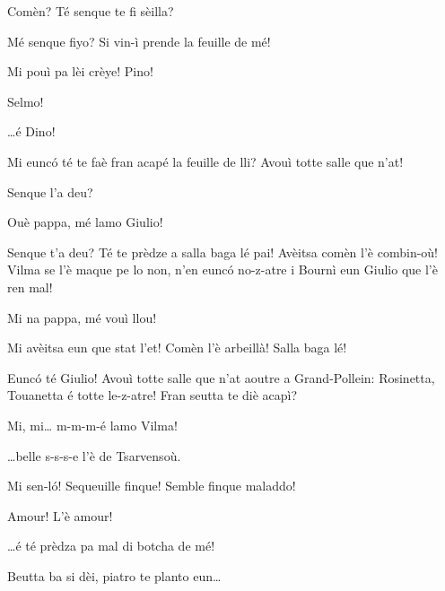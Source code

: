 \begin{drama}
\Selmospeaks Comèn? Té senque te fi sèilla?

\Pinospeaks{} Mé senque fiyo? Si vin-ì prende la feuille de mé!

\Selmospeaks{} Mi pouì pa lèi crèye! Pino!

\Pinospeaks Selmo!

\Dinospeaks \ldots é Dino!

\Selmospeaks{} Mi eunc\'o té te faè fran acapé la feuille de lli? Avouì totte salle que n'at!

\Pinospeaks{} Senque l'a deu?

\Vilmaspeaks Ouè pappa, mé lamo Giulio!

\Pinospeaks{} Senque t'a deu? Té te prèdze a salla baga  lé pai! Avèitsa comèn l'è combin-où! Vilma se l'è maque pe lo non, n'en eunc\'o no-z-atre i Bournì eun Giulio que l'è ren mal!

\Vilmaspeaks Mi na pappa, mé vouì  llou!

\Pinospeaks{} Mi avèitsa eun que stat l'et! Comèn l'è arbeillà! Salla baga lé!

\Selmospeaks Eunc\'o té Giulio! Avouì totte salle que n'at aoutre a Grand-Pollein: Rosinetta, Touanetta é totte le-z-atre! Fran seutta te diè acapì?

\Giuliospeaks{} Mi, mi\ldots {} m-m-m-é lamo Vilma!


\Giuliospeaks \ldots belle s-s-s-e l'è de Tsarvensoù.

\Pinospeaks{} Mi sen-l\'o! Sequeuille finque!  Semble finque maladdo!

\Dinospeaks Amour! L'è amour!


\newpage
\vspace*{-5mm}


\Selmospeaks \ldots é té prèdza pa mal di botcha de mé!

\Pinospeaks Beutta ba si dèi, piatro te planto eun\ldots


\end{drama}
